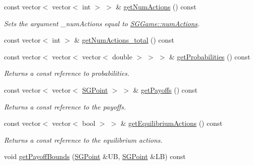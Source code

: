 \begin{DoxyCompactItemize}
const vector$<$ vector$<$ int $>$ $>$ \& \hyperlink{classSGGame_acfd5f0817645a9adf9474552aca4f62e}{get\+Num\+Actions} () const
\begin{DoxyCompactList}\small\item\em Sets the argument \+\_\+num\+Actions equal to \hyperlink{classSGGame_acebe94d195ffb67f92925bcd4c26d1a9}{S\+G\+Game\+::num\+Actions}. \end{DoxyCompactList}\item 
const vector$<$ int $>$ \& \hyperlink{classSGGame_a22f9effebebb711e2f174c4a95a49420}{get\+Num\+Actions\+\_\+total} () const
\item 
\mbox{\label{classSGGame_a0d2fef107bd38ad4c848fd35b0ed5ddf}} 
const vector$<$ vector$<$ vector$<$ double $>$ $>$ $>$ \& \hyperlink{classSGGame_a0d2fef107bd38ad4c848fd35b0ed5ddf}{get\+Probabilities} () const
\begin{DoxyCompactList}\small\item\em Returns a const reference to probabilities. \end{DoxyCompactList}\item 
\mbox{\label{classSGGame_a37036f4f8389a68c53b12eb75c1eb7af}} 
const vector$<$ vector$<$ \hyperlink{classSGPoint}{S\+G\+Point} $>$ $>$ \& \hyperlink{classSGGame_a37036f4f8389a68c53b12eb75c1eb7af}{get\+Payoffs} () const
\begin{DoxyCompactList}\small\item\em Returns a const reference to the payoffs. \end{DoxyCompactList}\item 
\mbox{\label{classSGGame_a5cbb8386739f0ddcb6bc1666dcba3b7b}} 
const vector$<$ vector$<$ bool $>$ $>$ \& \hyperlink{classSGGame_a5cbb8386739f0ddcb6bc1666dcba3b7b}{get\+Equilibrium\+Actions} () const
\begin{DoxyCompactList}\small\item\em Returns a const reference to the equilibrium actions. \end{DoxyCompactList}\item 
void \hyperlink{classSGGame_a32293b2ba26d2a8cd264e3b9e7559d22}{get\+Payoff\+Bounds} (\hyperlink{classSGPoint}{S\+G\+Point} \&UB, \hyperlink{classSGPoint}{S\+G\+Point} \&LB) const
\item 
\mbox{\label{classSGGame_aa32846060a1f8a9b9fc0419a1c1c0510}} 

\end{DoxyCompactItemize}
